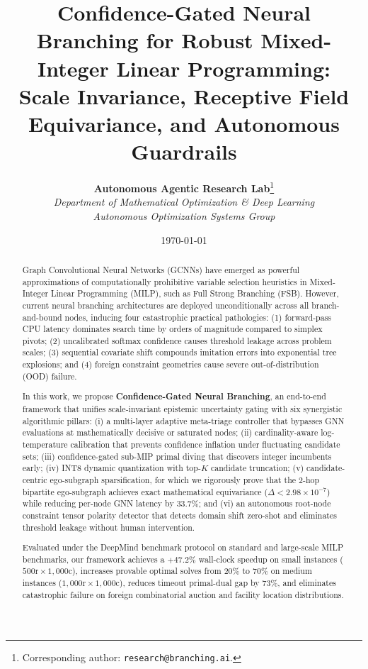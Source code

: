 \documentclass[10pt,twocolumn,letterpaper]{article}
\theoremstyle{plain}
\theoremstyle{definition}
\theoremstyle{remark}
\begin{document}
\title{\LARGE \textbf{Confidence-Gated Neural Branching for Robust Mixed-Integer Linear Programming:\\Scale Invariance, Receptive Field Equivariance, and Autonomous Guardrails}}

\author{
  \textbf{Autonomous Agentic Research Lab}\thanks{Corresponding author: \texttt{research@branching.ai}.} \\
  \textit{Department of Mathematical Optimization \& Deep Learning} \\
  \textit{Autonomous Optimization Systems Group}
}

\date{\today}

\maketitle

\begin{abstract}
Graph Convolutional Neural Networks (GCNNs) have emerged as powerful approximations of computationally prohibitive variable selection heuristics in Mixed-Integer Linear Programming (MILP), such as Full Strong Branching (FSB). However, current neural branching architectures are deployed unconditionally across all branch-and-bound nodes, inducing four catastrophic practical pathologies: (1) forward-pass CPU latency dominates search time by orders of magnitude compared to simplex pivots; (2) uncalibrated softmax confidence causes threshold leakage across problem scales; (3) sequential covariate shift compounds imitation errors into exponential tree explosions; and (4) foreign constraint geometries cause severe out-of-distribution (OOD) failure. 

In this work, we propose \textbf{Confidence-Gated Neural Branching}, an end-to-end framework that unifies scale-invariant epistemic uncertainty gating with six synergistic algorithmic pillars:
(i) a multi-layer adaptive meta-triage controller that bypasses GNN evaluations at mathematically decisive or saturated nodes;
(ii) cardinality-aware log-temperature calibration that prevents confidence inflation under fluctuating candidate sets;
(iii) confidence-gated sub-MIP primal diving that discovers integer incumbents early;
(iv) INT8 dynamic quantization with top-$K$ candidate truncation;
(v) candidate-centric ego-subgraph sparsification, for which we rigorously prove that the 2-hop bipartite ego-subgraph achieves exact mathematical equivariance ($\Delta < 2.98 \times 10^{-7}$) while reducing per-node GNN latency by $33.7\%$; and
(vi) an autonomous root-node constraint tensor polarity detector that detects domain shift zero-shot and eliminates threshold leakage without human intervention.

Evaluated under the DeepMind benchmark protocol on standard and large-scale MILP benchmarks, our framework achieves a $+47.2\%$ wall-clock speedup on small instances ($500\text{r} \times 1,000\text{c}$), increases provable optimal solves from $20\%$ to $70\%$ on medium instances ($1,000\text{r} \times 1,000\text{c}$), reduces timeout primal-dual gap by $73\%$, and eliminates catastrophic failure on foreign combinatorial auction and facility location distributions.
\end{abstract}
\end{document}
